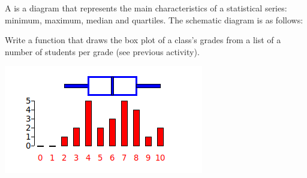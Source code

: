\documentclass[11pt,class=report,crop=false]{standalone}
\begin{document}
\begin{activite}


A  is a diagram that represents the main characteristics of a statistical series: minimum, maximum, median and quartiles. The schematic diagram is as follows:


Write a  function that draws the box plot of a class's grades from a list of a number of students per grade (see previous activity).

\begin{center}
\includegraphics[scale=\myscale,scale=0.7]{screen-stat-4-en}
\end{center}

	
\end{activite}



\end{document}
